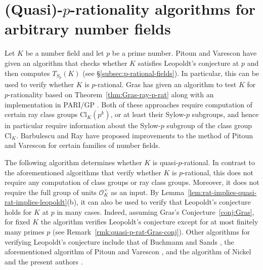\documentclass[12pt, a4paper, usenames]{amsart}
\theoremstyle{plain}
\theoremstyle{remark}
\theoremstyle{definition}
\newcommand{\Cl}{\mathrm{Cl}}
\begin{document}
\section{(Quasi)-$p$-rationality algorithms for arbitrary number fields}
\label{sec:quasi-p-rat-algs}

Let $K$ be a number field and let $p$ be a prime number.
Pitoun and Varescon \cite{MR3266966} have given an algorithm that
checks whether $K$ satisfies 
Leopoldt's conjecture at $p$ and then computes $T_{S_{p}}(K)$ (see 
\S \ref{subsec:p-rational-fields}). In particular, this can be used
to verify whether $K$ is $p$-rational.
Gras \cite{MR4491965} has given an algorithm to test $K$ for $p$-rationality 
based on Theorem~\ref{thm:Gras-ray-p-rat} along with an implementation in 
PARI/GP \cite{PARI2}.
Both of these approaches require computation of certain
ray class groups $\Cl_{K}(p^{k})$, or at least their Sylow-$p$ subgroups, and 
hence in particular require information about the Sylow-$p$ subgroup of the 
class group $\Cl_{K}$.
Barbulescu and Ray \cite{MR4158582} have proposed improvements to 
the method of Pitoun and Varescon for certain families of number fields.

The following algorithm determines whether $K$ is quasi-$p$-rational. 
In contrast to the aforementioned algorithms that verify whether $K$ is $p$-rational,
this does not require any computation of class groups or ray class groups.
Moreover, it does not require 
the full group of units $\mathcal{O}_{K}^{\times}$ as an input.
By Lemma~\ref{lem:rat-implies-quasi-rat-implies-leopoldt}(b),
it can also be used to verify that Leopoldt's conjecture holds for $K$ at $p$
in many cases. Indeed, assuming Gras's Conjecture~\ref{conj:Gras}, 
for fixed $K$ the algorithm verifies Leopoldt's conjecture
except for at most finitely many primes $p$ (see Remark~\ref{rmk:quasi-p-rat-Gras-conj}).
Other algorithms for verifying Leopoldt's conjecture include that 
of Buchmann and Sands \cite{MR904010}, 
the aforementioned algorithm of Pitoun and Varescon \cite[\S 3]{MR3266966}, 
and the algorithm of Nickel and the present authors \cite[Appendix~A.1]{MR4111943}.
\end{document}
